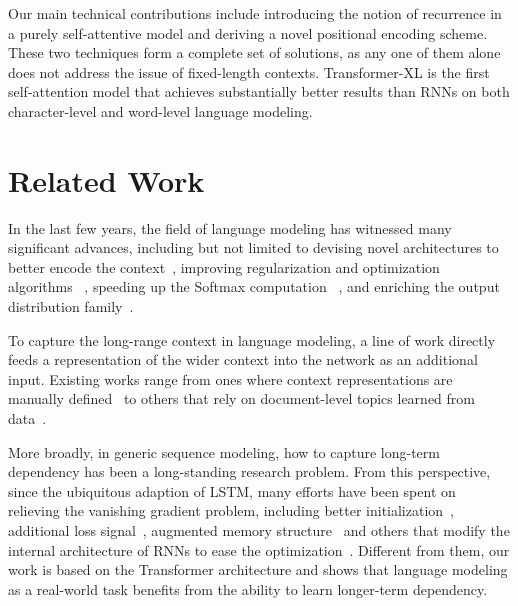 \documentclass[11pt,a4paper]{article}
\begin{document}
Our main technical contributions include introducing the notion of recurrence in a purely self-attentive model and deriving a novel positional encoding scheme. These two techniques form a complete set of solutions, as any one of them alone does not address the issue of fixed-length contexts. Transformer-XL is the first self-attention model that achieves substantially better results than RNNs on both character-level and word-level language modeling.





 \section{Related Work}
In the last few years, the field of language modeling has witnessed many significant advances, including but not limited to devising novel architectures to better encode the context~\citep{bengio2003neural,mikolov2010recurrent,
merity2016pointer,al2018character}, improving regularization and optimization algorithms~\cite{gal2016theoretically}
, speeding up the Softmax computation~\citep{grave2016efficient}
, and enriching the output distribution family~\citep{yang2017breaking}.


To capture the long-range context in language modeling, a line of work directly feeds a representation of the wider context into the network as an additional input.
Existing works range from ones where context representations are manually defined~\citep{mikolov2012context,ji2015document,wang2015larger} to others that rely on document-level topics learned from data~\citep{dieng2016topicrnn,wang2017topic}.

More broadly, in generic sequence modeling, how to capture long-term dependency has been a long-standing research problem.
From this perspective, since the ubiquitous adaption of LSTM, many efforts have been spent on relieving the vanishing gradient problem, including better initialization~\citep{le2015simple}, additional loss signal~\citep{trinh2018learning}, augmented memory structure~\citep{ke2018sparse} and others that modify the internal architecture of RNNs to ease the optimization~\cite{wu2016multiplicative,li2018independently}.
Different from them, our work is based on the Transformer architecture and shows that language modeling as a real-world task benefits from the ability to learn longer-term dependency.
\end{document}
